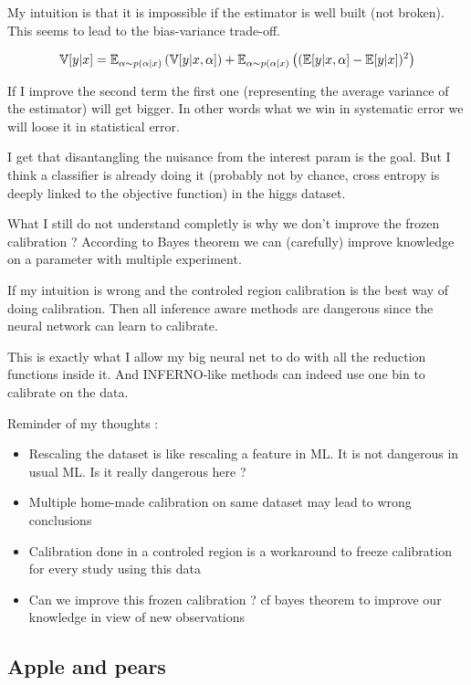 My intuition is that it is impossible if the estimator is well built (\ie not broken).
This seems to lead to the bias-variance trade-off.

$$
\mathbb{V}[y|x] = \mathbb{E}_{\alpha \sim p(\alpha|x)} \left (\mathbb{V}[y|x, \alpha] \right ) + \mathbb{E}_{\alpha \sim p(\alpha|x)} \left ( (\mathbb{E} [y|x, \alpha]  - \mathbb{E}[y|x])^2\right )
$$

If I improve the second term the first one (representing the average variance of the estimator) will get bigger.
In other words what we win in systematic error we will loose it in statistical error.

I get that disantangling the nuisance from the interest param is the goal. 
But I think a classifier is already doing it (probably not by chance, cross entropy is deeply linked to the objective function) in the higgs dataset.


What I still do not understand completly is why we don't improve the frozen calibration ?
According to Bayes theorem we can (carefully) improve knowledge on a parameter with multiple experiment.


If my intuition is wrong and the controled region calibration is the best way of doing calibration. 
Then all inference aware methods are dangerous since the neural network can learn to calibrate.

This is exactly what I allow my big neural net to do with all the reduction functions inside it.
And INFERNO-like methods can indeed use one bin to calibrate on the data.


Reminder of my thoughts :
\begin{itemize}
	\item Rescaling the dataset is like rescaling a feature in ML. It is not dangerous in usual ML. Is it really dangerous here ?
	\item Multiple home-made calibration on same dataset may lead to wrong conclusions
	\item Calibration done in a controled region is a workaround to freeze calibration for every study using this data
	\item Can we improve this frozen calibration ? cf bayes theorem to improve our knowledge in view of new observations
\end{itemize}



\subsection{Apple and pears} %
\label{sub:apple_and_pears}

